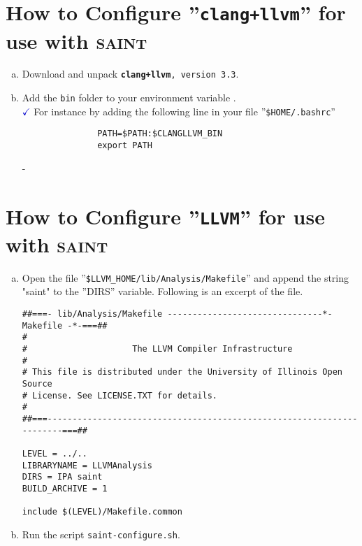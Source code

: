\documentclass[11pt]{article} %
\newcommand{\software}[2]{\texttt{\textbf{#1}, version #2}\xspace}
\newcommand{\tool}[1]{\texttt{#1}\xspace}
\newcommand{\script}[1]{\texttt{#1}\xspace}
\newcommand{\env}[1]{\textcolor{firebrickred}{\text{#1}}\xspace}
\newcommand{\mycheckmark}[1]{\textcolor{#1}{$\checkmark$}}
\begin{document}
\section{How to Configure ''\tool{clang+llvm}'' for use with \textsc{saint}}
\begin{enumerate}[a)]
       \item Download and unpack \software{clang+llvm}{3.3}.
       
       \item Add the \texttt{bin} folder to your environment variable \env{PATH}.\\
       \mycheckmark{mediumblue} For instance by adding the following line
       in your file ''\texttt{\$HOME/.bashrc}''
       \begin{verbatim}
               PATH=$PATH:$CLANGLLVM_BIN
               export PATH
       \end{verbatim}
-\end{enumerate}


\section{How to Configure ''\tool{LLVM}'' for use with \textsc{saint}}
\begin{enumerate}[a)]	
	\item Open the file ''\texttt{\$LLVM\_HOME/lib/Analysis/Makefile}'' and
	append the string "saint" to the ''DIRS'' variable.
	Following is an excerpt of the file.\\
	
	\begin{verbatim}
##===- lib/Analysis/Makefile -------------------------------*- Makefile -*-===##
#
#                     The LLVM Compiler Infrastructure
#
# This file is distributed under the University of Illinois Open Source
# License. See LICENSE.TXT for details.
#
##===----------------------------------------------------------------------===##

LEVEL = ../..
LIBRARYNAME = LLVMAnalysis
DIRS = IPA saint
BUILD_ARCHIVE = 1

include $(LEVEL)/Makefile.common
	\end{verbatim}		
	
	\item Run the script \script{saint-configure.sh}.
\end{enumerate}
\end{document}
